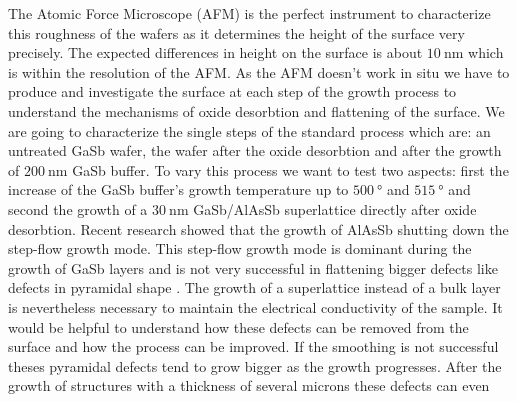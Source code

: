 The Atomic Force Microscope (AFM) is the perfect instrument to characterize this 
roughness of the wafers as it determines the height of the surface very 
precisely. The expected differences in height on the surface is about 
$\SI{10}{\nano\meter}$ which is within the resolution of the AFM.
As the AFM doesn't work in situ we have to produce and investigate the surface 
at each step of the growth process to understand the mechanisms of oxide 
desorbtion and flattening of the surface. We are going to characterize the 
single steps of the standard process which are: an untreated GaSb wafer, the 
wafer after the oxide desorbtion and after the growth of $\SI{200}{\nano\meter}$ 
GaSb buffer. To vary this process we want to test two aspects: first the 
increase of the GaSb buffer's growth temperature up to $\SI{500}{\degree}$ and 
$\SI{515}{\degree}$ and second the growth of a $\SI{30}{\nano\meter}$ 
GaSb/AlAsSb superlattice directly after oxide desorbtion. Recent research showed 
that the growth of AlAsSb shutting down the step-flow growth mode. This  
step-flow growth mode is dominant during the growth of GaSb layers and is not 
very successful in flattening bigger defects like defects in pyramidal shape 
\cite{murray}. The growth of a superlattice instead of a bulk layer is 
nevertheless necessary to maintain the electrical conductivity of the sample.
It would be helpful to understand how these defects can be removed from the 
surface and how the process can be improved. If the smoothing is not successful 
theses pyramidal defects tend to grow bigger as the growth progresses. After the 
growth of structures with a thickness of several microns these defects can even 
